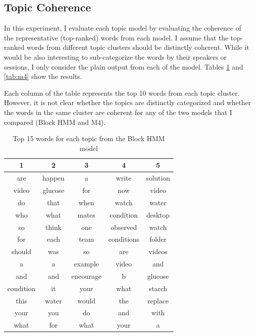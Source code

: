 \documentclass{article}
\begin{document}
\pagebreak

\subsection{Topic Coherence}

In this experiment, I evaluate each topic model by evaluating the coherence of the representative (top-ranked) words from each model. I assume that the top-ranked words from different topic clusters should be distinctly coherent. While it would be also interesting to sub-categorize the words by their speakers or sessions, I only consider the plain output from each of the model. Tables \ref{tab:block} and \ref{tab:m4} show the results.

Each column of the table represents the top 10 words from each topic cluster. However, it is not clear whether the topics are distinctly categorized and whether the words in the same cluster are coherent for any of the two models that I compared (Block HMM and M4). 

\begin{table}
    \begin{center}
    \caption{Top 15 words for each topic from the Block HMM model}
    \begin{tabular}{ccccc}
        \hline
        1 & 2 & 3 & 4 & 5 \\
        \hline
        are & happen & a & write & solution  \\
        video & glucose & for & now & video  \\
        do & that & when & watch & water  \\
        who & what & mates & condition & desktop  \\
        so & think & one & observed & watch  \\
        for & each & team & conditions & folder  \\
        should & was & so & are & videos  \\
        a & a & example & video & and  \\
        and & and & encourage & b & glucose  \\
        condition & it & your & what & starch  \\
        this & water & would & the & replace  \\
        your & you & do & and & with  \\
        what & for & what & your & a  \\
        \hline
    \end{tabular}
    \end{center}
    \label{tab:block}
\end{table}
\end{document}
